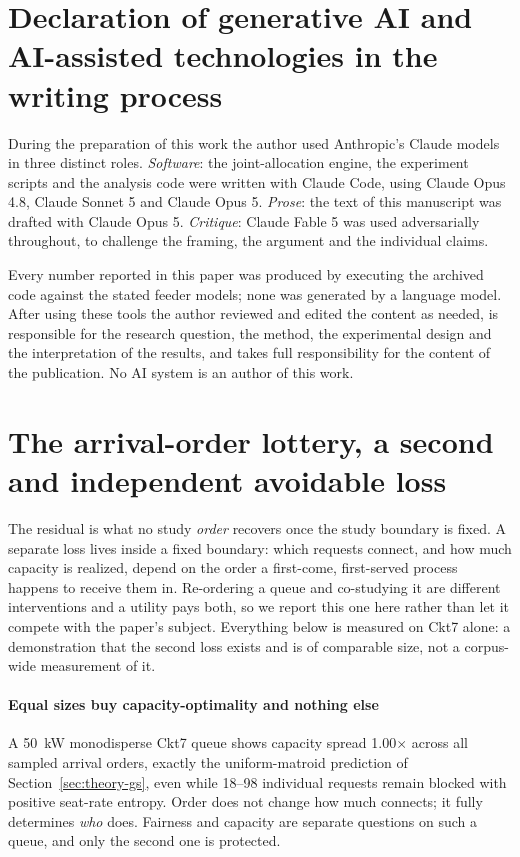 \documentclass[review,authoryear,12pt]{elsarticle}
\begin{document}
\section*{Declaration of generative AI and AI-assisted technologies in the
writing process}
During the preparation of this work the author used Anthropic's Claude models in
three distinct roles. \emph{Software}: the joint-allocation engine, the
experiment scripts and the analysis code were written with Claude Code, using
Claude Opus 4.8, Claude Sonnet 5 and Claude Opus 5. \emph{Prose}: the text of
this manuscript was drafted with Claude Opus 5. \emph{Critique}: Claude Fable 5
was used adversarially throughout, to challenge the framing, the argument and
the individual claims.

Every number reported in this paper was produced by executing the archived code
against the stated feeder models; none was generated by a language model. After
using these tools the author reviewed and edited the content as needed, is
responsible for the research question, the method, the experimental design and
the interpretation of the results, and takes full responsibility for the content
of the publication. No AI system is an author of this work.

\appendix

\section{The arrival-order lottery, a second and independent avoidable loss}
\label{app:arrival}

The residual is what no study \emph{order} recovers once the study boundary is
fixed. A separate loss lives inside a fixed boundary: which requests connect,
and how much capacity is realized, depend on the order a first-come,
first-served process happens to receive them in. Re-ordering a queue and
co-studying it are different interventions and a utility pays both, so we
report this one here rather than let it compete with the paper's subject.
Everything below is measured on Ckt7 alone: a demonstration that the second
loss exists and is of comparable size, not a corpus-wide measurement of it.

\paragraph{Equal sizes buy capacity-optimality and nothing else}
A 50~kW monodisperse Ckt7 queue shows capacity spread 1.00$\times$ across all
sampled arrival orders, exactly the uniform-matroid prediction of
Section~\ref{sec:theory-gs}, even while 18--98 individual requests remain
blocked with positive seat-rate entropy. Order does not change how much
connects; it fully determines \emph{who} does. Fairness and capacity are
separate questions on such a queue, and only the second one is protected.
\end{document}
